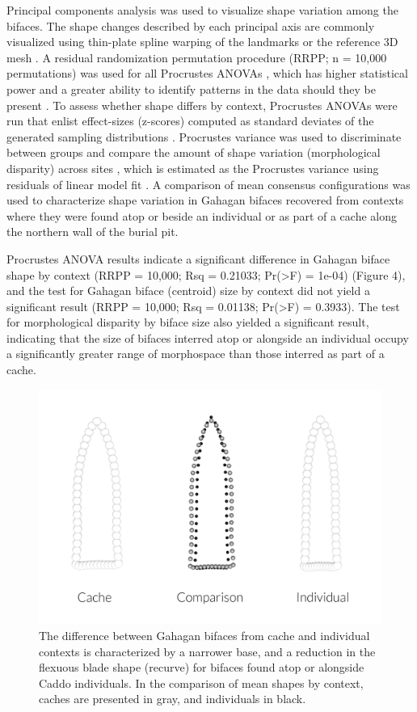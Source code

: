 \documentclass[]{interact}
\theoremstyle{plain}%
\theoremstyle{definition}
\theoremstyle{remark}
\begin{document}
Principal components analysis \citep{RN8576,RN10875} was used to
visualize shape variation among the bifaces. The shape changes described
by each principal axis are commonly visualized using thin-plate spline
warping of the landmarks or the reference 3D mesh \citep{RN8555,RN8553}.
A residual randomization permutation procedure (RRPP; n = 10,000
permutations) was used for all Procrustes ANOVAs \citep{RN8579,RN8334},
which has higher statistical power and a greater ability to identify
patterns in the data should they be present \citep{RN6995}. To assess
whether shape differs by context, Procrustes ANOVAs \citep{RN7046} were
run that enlist effect-sizes (z-scores) computed as standard deviates of
the generated sampling distributions \citep{RN8477}. Procrustes variance
was used to discriminate between groups and compare the amount of shape
variation (morphological disparity) across sites \citep{RN5694}, which
is estimated as the Procrustes variance using residuals of linear model
fit \citep{RN8565,RN9565}. A comparison of mean consensus configurations
was used to characterize shape variation in Gahagan bifaces recovered
from contexts where they were found atop or beside an individual or as
part of a cache along the northern wall of the burial pit.

Procrustes ANOVA results indicate a significant difference in Gahagan
biface shape by context (RRPP = 10,000; Rsq = 0.21033;
Pr(\textgreater F) = 1e-04) (Figure 4), and the test for Gahagan biface
(centroid) size by context did not yield a significant result (RRPP =
10,000; Rsq = 0.01138; Pr(\textgreater F) = 0.3933). The test for
morphological disparity by biface size also yielded a significant
result, indicating that the size of bifaces interred atop or alongside
an individual occupy a significantly greater range of morphospace than
those interred as part of a cache.

\begin{figure}

{\centering \includegraphics[width=0.9\linewidth]{img/fig05} 

}

\caption{The difference between Gahagan bifaces from cache and individual contexts is characterized by a narrower base, and a reduction in the flexuous blade shape (recurve) for bifaces found atop or alongside Caddo individuals. In the comparison of mean shapes by context, caches are presented in gray, and individuals in black.}\label{fig:mshape.bpractice}
\end{figure}
\end{document}
